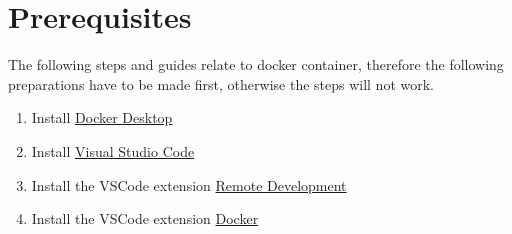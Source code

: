 

\chapter{Prerequisites}
    The following steps and guides relate to docker container, therefore the following preparations have to be made first, otherwise the steps will not work.  

    \begin{enumerate}
        \item Install \href{https://www.docker.com/products/docker-desktop/}{Docker Desktop}
        \item Install \href{https://code.visualstudio.com/download}{Visual Studio Code} 
        \item Install the VSCode extension \href{https://marketplace.visualstudio.com/items?itemName=ms-vscode-remote.vscode-remote-extensionpack}{Remote Development} 
        \item Install the VSCode extension \href{https://marketplace.visualstudio.com/items?itemName=ms-azuretools.vscode-docker}{Docker}
    \end{enumerate}    

